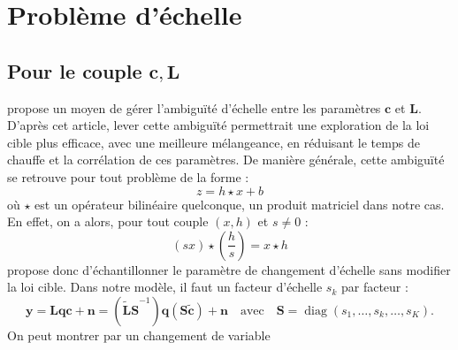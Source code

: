\documentclass[ 12pt]{article}
\begin{document}
%
%


\section{Problème d'échelle}
\subsection[]{Pour le couple $\bm{c},\bm{L}$}

\cite{veit2008reechantillonnage} propose un moyen de gérer l’ambiguïté d'échelle entre les paramètres $\bm{c}$ et $\bm{L}$. D'après cet article, lever cette ambiguïté permettrait une exploration de la loi cible plus efficace, avec une meilleure mélangeance, en réduisant le temps de chauffe et la corrélation de ces paramètres. 
De manière générale, cette ambiguïté se retrouve pour tout problème de la forme : 
\begin{equation*}
	    z=h \star x + b
\end{equation*}
où $\star$ est un opérateur bilinéaire quelconque, un produit matriciel dans notre cas. En effet, on a alors, pour tout couple $(x,h)$ et $s \neq 0$ :
\begin{equation*}
	    (sx) \star \left(\frac{h}{s} \right) = x \star h
\end{equation*}
\cite{veit2008reechantillonnage} propose donc d'échantillonner le paramètre de changement d'échelle sans modifier la loi cible. Dans notre modèle, il faut un facteur d'échelle $s_k$ par facteur :
\begin{equation*}
	    \bm{y} =  \bm{Lqc}+ \bm{n} = (\bm{\tilde{L}S}^{-1}) \bm{q}(\bm{S\tilde{c}}) + \bm{n} \quad \text{avec} \quad \bm{S} = \operatorname{diag}(s_1, \dots , s_k, \dots , s_K).
\end{equation*}
On peut montrer par un changement de variable 
\end{document}
